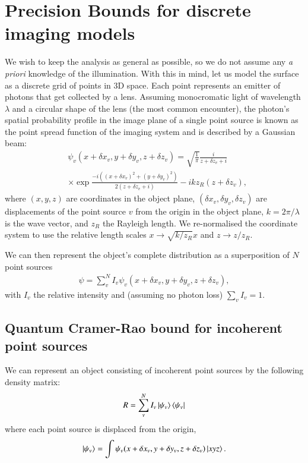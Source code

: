 \documentclass[reprint,amsmath,amssymb,aps,pra,floatfix]{revtex4-2}
\begin{document}
\section{\label{sec:CR-bounds} Precision Bounds for discrete imaging models}
We wish to keep the analysis as general as possible, so we do not assume any {\it a priori} knowledge of the illumination. With this in mind, let us model the surface as a discrete grid of points in 3D space. Each point represents an emitter of photons that get collected by a lens. Assuming monocromatic light of wavelength $\lambda$ and a circular shape of the lens (the most common encounter), the photon's spatial probability profile in the image plane of a single point source is known as the point spread function of the imaging system and is described by a Gaussian beam:
\begin{equation}
\begin{aligned}
\label{def:psf}
    &\psi_v (x+\delta x_v,y+\delta y_v,z+\delta z_v) = \sqrt{\frac{1}{\pi}} \frac{i}{z+\delta z_v + i} \\
    &\times \exp{\frac{-i((x+\delta x_v)^2 + (y+ \delta y_v)^2)}{2(z+\delta z_v + i)} - ikz_R(z+\delta z_v)},
\end{aligned}
\end{equation}
where $(x,y,z)$ are coordinates in the object plane, $(\delta x_v,\delta y_v,\delta z_v)$ are displacements of the point source $v$ from the origin in the object plane, $k= 2\pi / \lambda$ is the wave vector, and $z_R$ the Rayleigh length. We re-normalised the coordinate system to use the relative length scales $x \rightarrow \sqrt{k/z_R}x$ and $ z \rightarrow z/z_R$.

We can then represent the object's complete distribution as a superposition of $N$ point sources
\begin{align}
    \psi = \sum_v^N I_v \psi_v (x+\delta x_v, y+\delta y_v,z+\delta z_v),
\end{align}
with $I_v$ the relative intensity and (assuming no photon loss) $\sum_v I_v = 1$.

\subsection{\label{subsec:QFI_incoherent} Quantum Cramer-Rao bound for incoherent point sources}
We can represent an object consisting of incoherent point sources by the following density matrix:
\begin{align}
    R = \sum_v^N I_v \ket{\psi_v}\bra{\psi_v}
\end{align}
where each point source is displaced from the origin,
\begin{align}
    \ket{\psi_v} = \int \psi_v (x+\delta x_v,y+\delta y_v,z+\delta z_v) \ket{xyz}.
\end{align}
\end{document}
